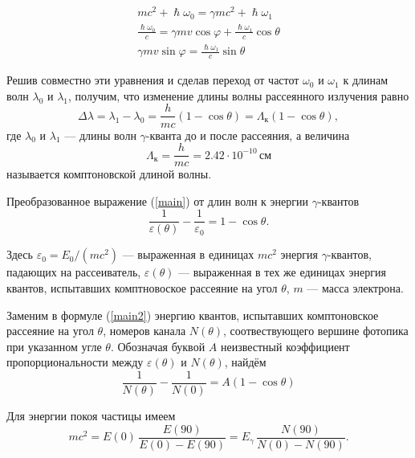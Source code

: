 \documentclass[12pt]{article}
\begin{document}
\begin{align*}
	mc^2 + \hslash \omega_0 = \gamma mc^2 + \hslash \omega_1 \\
	\frac{\hslash \omega_0}{c} = \gamma mv \cos \varphi + \frac{\hslash \omega_1}{c} \cos \theta \\
	\gamma m v \sin \varphi = \frac{\hslash \omega_1}{c} \sin \theta
\end{align*}
\par
	Решив совместно эти уравнения и сделав переход от частот $\omega_0$ и $\omega_1$ к длинам  волн $\lambda_0$ и $\lambda_1$, получим, что изменение длины волны рассеянного излучения равно
\begin{equation}
	\Delta \lambda = \lambda_1 - \lambda_0 = \frac{h}{mc}\left(1 - \cos \theta \right) = \Lambda_\text{к} \left(1 - \cos \theta \right), \label{main} 
\end{equation}
где $\lambda_0$ и $\lambda_1$ --- длины волн $\gamma$-кванта до и после рассеяния, а величина
\[
	\Lambda_\text{к} = \frac{h}{mc} = 2.42 \cdot 10^{-10} \, \text{см}
\]
называется комптоновской длиной волны.
\par
	Преобразованное выражение (\ref{main}) от длин волн к энергии $\gamma$-квантов
\begin{equation}
	\frac{1}{\varepsilon(\theta)} - \frac{1}{\varepsilon_0} = 1 - \cos \theta. \label{main2}
\end{equation}
\par
	Здесь $\varepsilon_0 = E_0 / (mc^2)$ --- выраженная в единицах $mc^2$ энергия $\gamma$-квантов, падающих на рассеиватель, $\varepsilon(\theta)$ --- выраженная в тех же единицах энергия квантов, испытавших комптновоское рассеяние на угол $\theta$, $m$ --- масса электрона.
\par
	Заменим в формуле (\ref{main2}) энергию квантов, испытавших комптоновское рассеяние на угол $\theta$, номеров канала $N(\theta)$, соотвествующего вершине фотопика при указанном угле $\theta$. Обозначая буквой $A$ неизвестный коэффициент пропорциональности между $\varepsilon(\theta)$ и $N(\theta)$, найдём
\begin{equation}
	\frac{1}{N(\theta)} - \frac{1}{N(0)} = A \left(1 - \cos \theta \right)
\end{equation}
\par
	Для энергии покоя частицы имеем
\begin{equation}
	mc^2 = E(0) \, \frac{E(90)}{E(0) - E(90)} = E_\gamma \, \frac{N(90)}{N(0) - N(90)}.
\end{equation}
\end{document}
